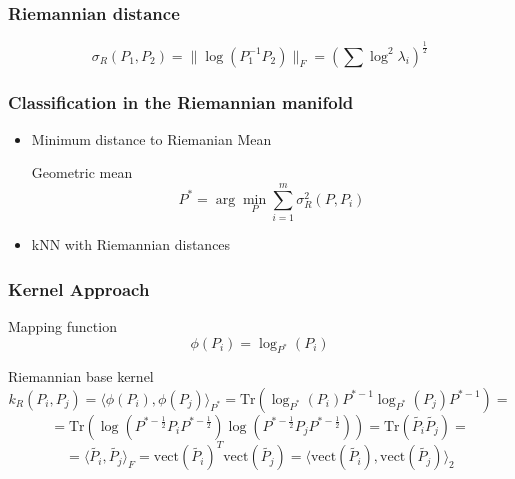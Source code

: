 \documentclass{beamer}
\begin{document}

\begin{frame}
\frametitle{Riemannian distance}
\begin{block}{}
\begin{equation*}
	\sigma_R (P_1, P_2) = \|\log(P_1^{-1}P_2)\|_F = \left( \sum \log^2\lambda_i \right)^{\frac12}
\end{equation*}
\end{block}
\end{frame}


\begin{frame}
\frametitle{ Classification in the Riemannian manifold}
\begin{itemize}
	\item Minimum distance to Riemanian Mean
\begin{block}{Geometric mean}
	\begin{equation*}
	P^* = \arg\min_P \sum_{i=1}^{m}\sigma^2_R(P, P_i)
	\end{equation*}
\end{block}
\vfill
\item kNN with Riemannian distances
\end{itemize}

\end{frame}




\begin{frame}
\frametitle{Kernel Approach}

\begin{block}{Mapping function}
	\begin{equation*}
		\phi (P_i) = \log_{P^*}(P_i)
	\end{equation*}
\end{block}
\begin{block}{Riemannian base kernel}
	\begin{equation*}
 k_R(P_i,P_j) = \langle 	\phi (P_i), 	\phi (P_j)\rangle_{P^*} = \text{Tr}( \log_{P^*}(P_i)P^{*-1} \log_{P^*}(P_j)P^{*-1}) = 
	\end{equation*}
	\begin{equation*}
 =	\text{Tr}( \log (P^{*-\frac12}P_i P^{*-\frac12}) \log (P^{*-\frac12}P_j P^{*-\frac12})) =	\text{Tr}(\tilde{P_i}\tilde{P_j}) = 
	\end{equation*}
	\begin{equation*}
	= \langle \tilde{P_i},\tilde{P_j} \rangle_F =  \text{vect}(\tilde{P_i})^T  \text{vect}(\tilde{P_j}) =  \langle  \text{vect}(\tilde{P_i}), \text{vect}(\tilde{P_j}) \rangle_2
	\end{equation*}
\end{block}

\end{frame}
\end{document}
